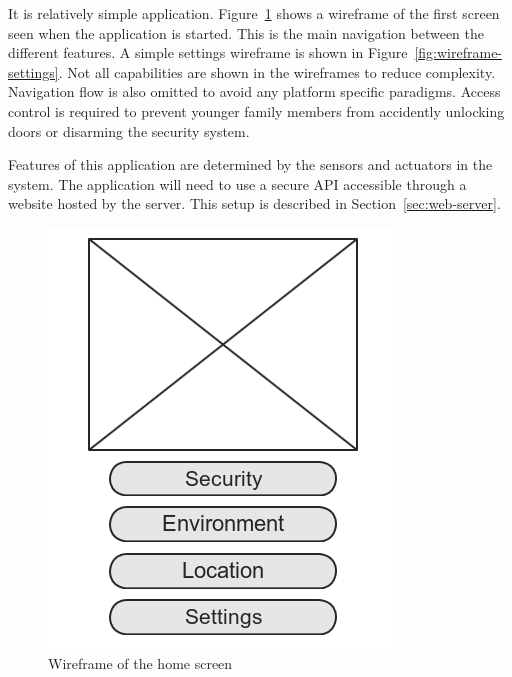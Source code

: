 \documentclass{report}
\begin{document}
It is relatively simple application. Figure~\ref{fig:wireframe-home} shows a
wireframe of the first screen seen when the application is started. This is the
main navigation between the different features. A simple settings wireframe is
shown in Figure~\ref{fig:wireframe-settings}. Not all capabilities are shown in
the wireframes to reduce complexity. Navigation flow is also omitted to avoid
any platform specific paradigms. Access control is required to prevent younger
family members from accidently unlocking doors or disarming the security
system.

Features of this application are determined by the sensors and actuators in the
system. The application will need to use a secure API accessible through a
website hosted by the server. This setup is described in
Section~\ref{sec:web-server}.

\begin{figure}[H]
    \centering
    \includegraphics[scale=0.5]{mock_home}
    \caption[Wireframe of the home screen]
            {Wireframe of the home screen}
    \label{fig:wireframe-home}
\end{figure}
\end{document}
